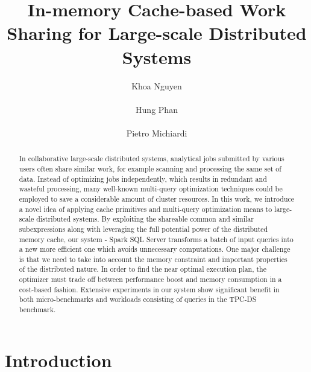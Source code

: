 \documentclass{acmsig}
\begin{document}
\title{In-memory Cache-based Work Sharing for Large-scale Distributed Systems}


\author{
\alignauthor
Khoa Nguyen\\
       \\
\alignauthor
Hung Phan\\
       \\
\alignauthor 
Pietro Michiardi
       \\
}
\maketitle

\begin{abstract}
In collaborative large-scale distributed systems, analytical jobs submitted by various users often share similar work, for example scanning and processing the same set of data. Instead of optimizing jobs independently, which results in redundant and wasteful processing, many well-known multi-query optimization techniques could be employed to save a considerable amount of cluster resources. In this work, we introduce a novel idea of applying cache primitives and multi-query optimization means to large-scale distributed systems. By exploiting the shareable common and similar subexpressions along with leveraging the full potential power of the distributed memory cache, our system - Spark SQL Server transforms a batch of input queries into a new more efficient one which avoids unnecessary computations. One major challenge is that we need to take into account the memory constraint and important properties of the distributed nature. In order to find the near optimal execution plan, the optimizer must trade off between performance boost and memory consumption in a cost-based fashion. Extensive experiments in our system show significant benefit in both micro-benchmarks and workloads consisting of queries in the TPC-DS benchmark.
\end{abstract}

\section{Introduction}
\label{sec:introduction}

\end{document}
